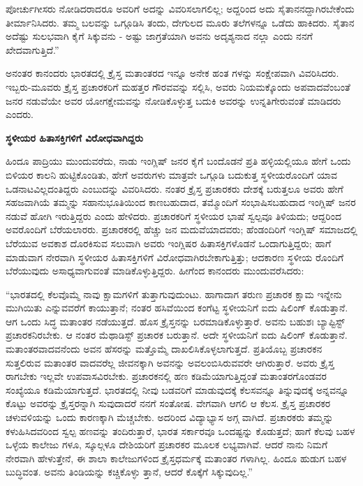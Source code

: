 ಪೋರ್ಚುಗೀಸರು ನೋಡಿದರಾದರೂ ಅವರಿಗೆ ಅದನ್ನು ವಿವರಿಸಲಾಗಲಿಲ್ಲ; ಅದ್ದರಿಂದ ಅದು ಸೈತಾನನದ್ದಾಗಿರಬೇಕೆಂದು ತೀರ್ಮಾನಿಸಿದರು. ತಮ್ಮ ಬಲವನ್ನು ಒಗ್ಗೂಡಿಸಿ ತಂದು, ದೇಗುಲದ ಮೂರು ತಲೆಗಳನ್ನೂ ಒಡೆದು ಹಾಕಿದರು. ಸೈತಾನ ಅದೆಷ್ಟು ಸುಲಭವಾಗಿ ಕೈಗೆ ಸಿಕ್ಕುವನು - ಅಷ್ಟು ಜಾಗ್ರತೆಯಾಗಿ ಅವನು ಅದೃಶ್ಯನಾದ ನಲ್ಲಾ ಎಂದು ನನಗೆ ಖೇದವಾಗುತ್ತಿದೆ.”

ಅನಂತರ ಕಾನಂದರು ಭಾರತದಲ್ಲಿ ಕ್ರೈಸ್ತ ಮತಾಂತರದ ಇನ್ನೂ ಅನೇಕ ಹಂತ ಗಳನ್ನು ಸಂಕ್ಷೇಪವಾಗಿ ವಿವರಿಸಿದರು. ಇಬ್ಬರು-ಮೂವರು ಕ್ರೈಸ್ತ ಪ್ರಚಾರಕರಿಗೆ ಮಹತ್ತರ ಗೌರವವನ್ನು ಸಲ್ಲಿಸಿ, ಅವರು ನಿಯಮಕ್ಕೊಂದು ಅಪವಾದವೆಂಬಂತೆ ಜನರ ನಡುವೆಯೇ ಅವರ ಯೋಗಕ್ಷೇಮವನ್ನು ನೋಡಿಕೊಳ್ಳುತ್ತ ಬದುಕಿ ಅವರನ್ನು ಉನ್ನತಿಗೇರುವಂತೆ ಮಾಡಿದರು ಎಂದರು.

\begin{center}
\textbf{ಸ್ಥಳೀಯರ ಹಿತಾಸಕ್ತಿಗಳಿಗೆ ವಿರೋಧವಾಗಿದ್ದರು}
\end{center}

ಹಿಂದೂ ಪಾದ್ರಿಯು ಮುಂದುವರೆದು, ನಾಡು ಇಂಗ್ಲಿಷ್ ಜನರ ಕೈಗೆ ಬಂದೊಡನೆ ಪ್ರತಿ ಹಳ್ಳಿಯಲ್ಲಿಯೂ ಹೇಗೆ ಒಂದು ಬಿಳಿಯರ ಕಾಲನಿ ಹುಟ್ಟಿಕೊಂಡಿತು, ಹೇಗೆ ಅವರುಗಳು ಮಾತ್ರವೇ ಒಗ್ಗೂಡಿ ಬದುಕುತ್ತ ಸ್ಥಳೀಯರೊಂದಿಗೆ ಯಾವ ಒಡನಾಟವಿಲ್ಲದಂತಿದ್ದರು ಎಂಬುದನ್ನು ವಿವರಿಸಿದರು. ನಂತರ ಕ್ರೈಸ್ತ ಪ್ರಚಾರಕರು ದೇಶಕ್ಕೆ ಬರುತ್ತಲೂ ಅವರು ಹೇಗೆ ಸಹಜವಾಗಿಯೆ ತಮ್ಮನ್ನು ಸಹಾನುಭೂತಿಯಿಂದ ಕಾಣಬಹುದಾದ, ತಮ್ಮೊಂದಿಗೆ ಸಂಭಾಷಿಸಬಹುದಾದ ಇಂಗ್ಲಿಷ್ ಜನರ ನಡುವೆ ಹೋಗಿ ಇರುತ್ತಿದ್ದರು ಎಂದು ಹೇಳಿದರು. ಪ್ರಚಾರಕರಿಗೆ ಸ್ಥಳೀಯರ ಭಾಷೆ ಸ್ವಲ್ಪವೂ ತಿಳಿಯದು; ಆದ್ದರಿಂದ ಅವರೊಂದಿಗೆ ಬೆರೆಯಲಾರರು. ಪ್ರಚಾರಕರಲ್ಲಿ ಹೆಚ್ಚು ಜನ ಮದುವೆಯಾದವರು; ಹೆಂಡಂದಿರಿಗೆ ಇಂಗ್ಲಿಷ್ ಸಮಾಜದಲ್ಲಿ ಬೆರೆಯುವ ಅವಕಾಶ ದೊರಕಿಸುವ ಸಲುವಾಗಿ ಅವರು ಇಂಗ್ಲಿಷರ ಹಿತಾಸಕ್ತಿಗಳೊಡನೆ ಒಂದಾಗುತ್ತಿದ್ದರು; ಹಾಗೆ ಮಾಡುವಾಗ ನೇರವಾಗಿ ಸ್ಥಳೀಯರ ಹಿತಾಸಕ್ತಿಗಳಿಗೆ ವಿರೋಧವಾಗಿರಬೇಕಾಗುತ್ತಿತ್ತು; ಆದಕಾರಣ ಸ್ಥಳೀಯ ರೊಂದಿಗೆ ಬೆರೆಯುವುದು ಅಸಾಧ್ಯವಾಗುವಂತೆ ಮಾಡಿಕೊಳ್ಳುತ್ತಿದ್ದರು. ಹೀಗೆಂದ ಕಾನಂದರು ಮುಂದುವರೆಸಿದರು:

“ಭಾರತದಲ್ಲಿ ಕೆಲವೊಮ್ಮೆ ನಾವು ಕ್ಷಾಮಗಳಿಗೆ ತುತ್ತಾಗುವುದುಂಟು. ಹಾಗಾದಾಗ ತರುಣ ಪ್ರಚಾರಕ ಕ್ಷಾಮ ಇನ್ನೇನು ಮುಗಿಯಿತು ಎನ್ನುವವರೆಗೆ ಕಾಯುತ್ತಾನೆ; ನಂತರ ಹಸಿವೆಯಿಂದ ಕಂಗೆಟ್ಟ ಸ್ಥಳೀಯನಿಗೆ ಐದು ಷಿಲಿಂಗ್ ಕೊಡುತ್ತಾನೆ. ಆಗ ಒಂದು ಸಿದ್ಧ ಮತಾಂತರ ನಡೆಯುತ್ತದೆ. ಹೊಸ ಕ್ರೈಸ್ತನನ್ನು ಬರಮಾಡಿಕೊಳ್ಳುತ್ತಾರೆ. ಅವನು ಬಹುಶಃ ಬ್ಯಾಪ್ಟಿಸ್ಟ್ ಪ್ರಚಾರಕನಿರಬೇಕು. ಆ ನಂತರ ಮೆಥಾಡಿಸ್ಟ್ ಪ್ರಚಾರಕ ಬರುತ್ತಾನೆ. ಅದೇ ಸ್ಥಳೀಯನಿಗೆ ಐದು ಷಿಲಿಂಗ್ ಕೊಡುತ್ತಾನೆ. ಮತಾಂತರವಾದವನೆಂದು ಅವನ ಹೆಸರನ್ನು ಮತ್ತೊಮ್ಮೆ ದಾಖಲಿಸಿಕೊಳ್ಳಲಾಗುತ್ತದೆ. ಪ್ರತಿಯೊಬ್ಬ ಪ್ರಚಾರಕನ ಸುತ್ತಲಿರುವ ಮತಾಂತರ ವಾದವರೆಲ್ಲ ಜೀವನಕ್ಕಾಗಿ ಅವನನ್ನು ಅವಲಂಬಿಸಿರುವವರೇ ಆಗಿರುತ್ತಾರೆ. ಅವರು ಕ್ರೈಸ್ತ ರಾಗಬೇಕು ಇಲ್ಲವೇ ಉಪವಾಸವಿರಬೇಕು. ಪ್ರಚಾರಕನಲ್ಲಿ ಹಣ ಕಡಿಮೆಯಾಗುತ್ತಿದ್ದಂತೆ ಮತಾಂತರಗೊಂಡವರ ಸಂಖ್ಯೆಯೂ ಕಡಿಮೆಯಾಗುತ್ತದೆ. ಭಾರತದಲ್ಲಿ ನೀವು ಬಡವರಿಗೆ ಮಾಡುವುದಕ್ಕೆ ಕೆಲಸವನ್ನೂ ತಿನ್ನುವುದಕ್ಕೆ ಅನ್ನವನ್ನೂ ಕೊಟ್ಟು ಅವರನ್ನು ಕ್ರೈಸ್ತರನ್ನಾಗಿ ಸುವುದಾದರೆ ನನಗೆ ಸಂತೋಷ. ವೇಗವಾಗಿ ಆಗಲಿ ಆ ಕೆಲಸ. ಕ್ರೈಸ್ತ ಪ್ರಚಾರಕರ ಚಳುವಳಿಯನ್ನು ಒಂದು ಕಾರಣಕ್ಕಾಗಿ ಮೆಚ್ಚಬೇಕು. ಅದರಿಂದ ವಿದ್ಯಾಭ್ಯಾಸ ಅಗ್ಗ ವಾಗಿದೆ. ಪ್ರಚಾರಕರು ತಮ್ಮನ್ನು ಕಳುಹಿಸಿದವರಿಂದ ಸ್ವಲ್ಪ ಹಣವನ್ನು ತಂದಿರುತ್ತಾರೆ, ಭಾರತ ಸರ್ಕಾರವೂ ಒಂದಷ್ಟನ್ನು ಕೊಡುತ್ತದೆ; ಹಾಗೆ ಕೆಲವು ಬಹಳ ಒಳ್ಳೆಯ ಕಾಲೇಜು ಗಳೂ, ಸ್ಕೂಲ್ಗಳೂ ದೇಶಿಯರಿಗೆ ಪ್ರಚಾರಕರ ಮೂಲಕ ಲಭ್ಯವಾಗಿವೆ. ಆದರೆ ನಾನು ನಿಮಗೆ ನೇರವಾಗಿ ಹೇಳುತ್ತೇನೆ, ಈ ಶಾಲಾ ಕಾಲೇಜುಗಳಿಂದ ಕ್ರೈಸ್ತಧರ್ಮಕ್ಕೆ ಮತಾಂತರ ಗಳಾಗಿಲ್ಲ. ಹಿಂದೂ ಹುಡುಗ ಬಹಳ ಬುದ್ಧಿವಂತ. ಅವನು ತಿಂಡಿಯನ್ನು ಕಚ್ಚಿಕೊಳ್ಳು ತ್ತಾನೆ, ಆದರೆ ಕೊಕ್ಕೆಗೆ ಸಿಕ್ಕುವುದಿಲ್ಲ.”

